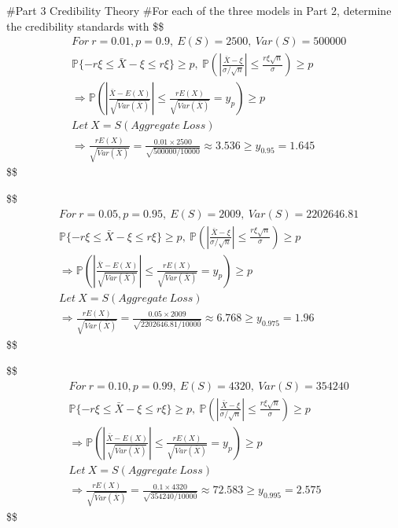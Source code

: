 \documentclass[
]{article}
\begin{document}
\#Part 3 Credibility Theory \#For each of the three models in Part 2,
determine the credibility standards with \$\$ \begin{align*}

& For \: r = 0.01, p = 0.9, \: E(S) = 2500, \: Var(S) = 500000
\\
& \mathbb{P}\{ -r\xi \leq \bar{X} - \xi \leq r\xi \} \geq p, \: \mathbb{P}(|\frac{\bar{X}-\xi}{\sigma/\sqrt{n}}| \leq \frac{r\xi\sqrt{n}}{\sigma}) \geq p
\\
& \Rightarrow \mathbb{P}(|\frac{\bar{X}-E(X)}{\sqrt{Var(\bar{X})}}| \leq \frac{rE(X)}{\sqrt{Var(\bar{X})}}=y_{p}) \geq p
\\
& Let \: X = S(Aggregate \: Loss)
\\
& \Rightarrow \frac{rE(X)}{\sqrt{Var(\bar{X})}} = \frac{0.01 \times 2500}{\sqrt{500000/10000}} \approx 3.536 \geq y_{0.95} = 1.645

\end{align*} \$\$

\$\$ \begin{align*}

& For \: r = 0.05, p = 0.95, \: E(S) = 2009, \: Var(S) = 2202646.81
\\
& \mathbb{P}\{ -r\xi \leq \bar{X} - \xi \leq r\xi \} \geq p, \: \mathbb{P}(|\frac{\bar{X}-\xi}{\sigma/\sqrt{n}}| \leq \frac{r\xi\sqrt{n}}{\sigma}) \geq p
\\
& \Rightarrow \mathbb{P}(|\frac{\bar{X}-E(X)}{\sqrt{Var(\bar{X})}}| \leq \frac{rE(X)}{\sqrt{Var(\bar{X})}}=y_{p}) \geq p
\\
& Let \: X = S(Aggregate \: Loss)
\\
& \Rightarrow \frac{rE(X)}{\sqrt{Var(\bar{X})}} = \frac{0.05 \times 2009}{\sqrt{2202646.81/10000}} \approx 6.768 \geq y_{0.975} = 1.96

\end{align*} \$\$

\$\$ \begin{align*}

& For \: r = 0.10, p = 0.99, \: E(S) = 4320, \: Var(S) = 354240
\\
& \mathbb{P}\{ -r\xi \leq \bar{X} - \xi \leq r\xi \} \geq p, \: \mathbb{P}(|\frac{\bar{X}-\xi}{\sigma/\sqrt{n}}| \leq \frac{r\xi\sqrt{n}}{\sigma}) \geq p
\\
& \Rightarrow \mathbb{P}(|\frac{\bar{X}-E(X)}{\sqrt{Var(\bar{X})}}| \leq \frac{rE(X)}{\sqrt{Var(\bar{X})}}=y_{p}) \geq p
\\
& Let \: X = S(Aggregate \: Loss)
\\
& \Rightarrow \frac{rE(X)}{\sqrt{Var(\bar{X})}} = \frac{0.1 \times 4320}{\sqrt{354240/10000}} \approx 72.583 \geq y_{0.995} = 2.575

\end{align*} \$\$
\end{document}

